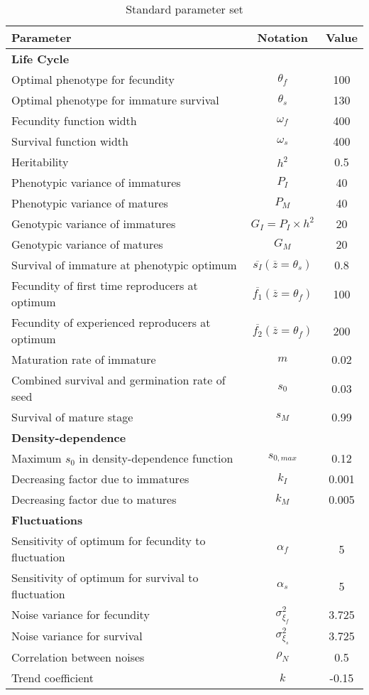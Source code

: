 \begin{table}
\begin{center}
	\begin{tabular}{l c c}
		\hline \hline
		Parameter & Notation & Value \\
		\hline
		\multicolumn{3}{l}{\textbf{Life Cycle}} \\
		Optimal phenotype for fecundity & $\theta_{f}$ & 100 \\
		Optimal phenotype for immature survival & $\theta_{s}$ & 130 \\
		Fecundity function width & $\omega_{f}$ & 400 \\
		Survival function width & $\omega_{s}$ & 400 \\
		Heritability & $h^2$ & 0.5 \\
		Phenotypic variance of immatures & $P_{I}$ & 40 \\
		Phenotypic variance of matures & $P_{M}$ & 40 \\
		Genotypic variance of immatures & $G_{I} = P_{I} \times h^2$ & 20 \\
		Genotypic variance of matures & $G_{M}$ & 20 \\
		Survival of immature at phenotypic optimum & $\overline{s_{I}}(\overline{z} = \theta_{s})$ & 0.8 \\
		Fecundity of first time reproducers at optimum & $\overline{f_{1}}(\overline{z} = \theta_{f})$ & 100 \\
		Fecundity of experienced reproducers at optimum & $\overline{f_{2}}(\overline{z} = \theta_{f})$ & 200 \\
		Maturation rate of immature & $m$ & 0.02 \\
		Combined survival and germination rate of seed & $s_{0}$ & 0.03 \\
		Survival of mature stage & $s_{M}$ & 0.99 \\
		\multicolumn{3}{l}{\textbf{Density-dependence}} \\
		Maximum $s_{0}$ in density-dependence function & $s_{0, max}$ & 0.12 \\
		Decreasing factor due to immatures & $k_{I}$ & 0.001 \\
		Decreasing factor due to matures & $k_{M}$ & 0.005 \\
		\multicolumn{3}{l}{\textbf{Fluctuations}} \\
		Sensitivity of optimum for fecundity to fluctuation & $\alpha_{f}$ & 5 \\
		Sensitivity of optimum for survival to fluctuation & $\alpha_{s}$ & 5 \\
		Noise variance for fecundity & $\sigma_{\xi_{f}}^2$ & 3.725 \\
		Noise variance for survival & $\sigma_{\xi_{s}}^2$ & 3.725 \\
		Correlation between noises & $\rho_{N}$ & 0.5 \\
		Trend coefficient & $k$ & -0.15 \\
		\hline \hline
	\end{tabular}
	\caption{Standard parameter set}
	\label{tab:params}
\end{center}
\end{table}

